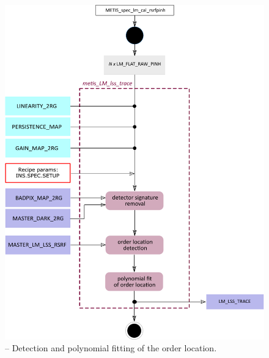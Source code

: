 \begin{figure}[ht]
  \centering
  \includegraphics[width=0.5\textheight]{figures/metis_lm_lss_trace_v0.83.pdf}
  \caption[Recipe: ]{ --
    Detection and polynomial fitting of the order location.}
  \label{Fig:rec_lm_lss_wtrace}
\end{figure}

